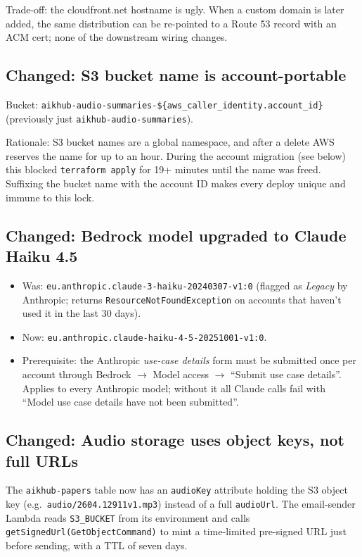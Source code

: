 \documentclass[11pt,a4paper]{article}
\begin{document}
Trade-off: the cloudfront.net hostname is ugly. When a custom domain is
later added, the same distribution can be re-pointed to a Route 53 record
with an ACM cert; none of the downstream wiring changes.

\subsection{Changed: S3 bucket name is account-portable}

Bucket: \texttt{aikhub-audio-summaries-\$\{aws\_caller\_identity.account\_id\}}
(previously just \texttt{aikhub-audio-summaries}).

Rationale: S3 bucket names are a global namespace, and after a delete
AWS reserves the name for up to an hour. During the account migration
(see below) this blocked \texttt{terraform apply} for 19+ minutes until
the name was freed. Suffixing the bucket name with the account ID makes
every deploy unique and immune to this lock.

\subsection{Changed: Bedrock model upgraded to Claude Haiku 4.5}

\begin{itemize}[leftmargin=*]
  \item Was: \texttt{eu.anthropic.claude-3-haiku-20240307-v1:0}
        (flagged as \emph{Legacy} by Anthropic; returns
        \texttt{ResourceNotFoundException} on accounts that haven't used
        it in the last 30 days).
  \item Now: \texttt{eu.anthropic.claude-haiku-4-5-20251001-v1:0}.
  \item Prerequisite: the Anthropic \emph{use-case details} form must be
        submitted once per account through Bedrock $\to$ Model access
        $\to$ ``Submit use case details''. Applies to every Anthropic
        model; without it all Claude calls fail with
        ``Model use case details have not been submitted''.
\end{itemize}

\subsection{Changed: Audio storage uses object keys, not full URLs}

The \texttt{aikhub-papers} table now has an \texttt{audioKey} attribute
holding the S3 object key (e.g.\ \texttt{audio/2604.12911v1.mp3}) instead
of a full \texttt{audioUrl}. The email-sender Lambda reads
\texttt{S3\_BUCKET} from its environment and calls
\texttt{getSignedUrl(GetObjectCommand)} to mint a time-limited
pre-signed URL just before sending, with a TTL of seven days.
\end{document}

